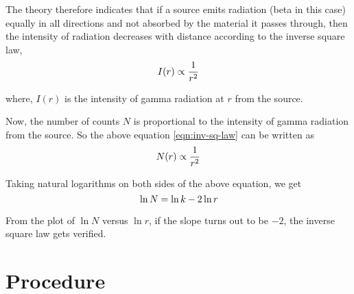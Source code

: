 	The theory therefore indicates that if a source emits radiation (beta in this case) equally in all directions and not absorbed by the material it passes through, then the intensity of radiation decreases with distance according to the inverse square law,
	\begin{equation}{\label{eqn:inv-sq-law}}
		I(r) \propto \dfrac{1}{r^2}
	\end{equation}
	
	where, $ I(r) $ is the intensity of gamma radiation at $ r $ from the source. 
	
	Now, the number of counts $ N $ is proportional to the intensity of gamma radiation from the source. So the above equation \ref{eqn:inv-sq-law} can be written as
	\begin{equation}{\label{eqn:inv-sq-law-N}}
		N(r) \propto \dfrac{1}{r^2}
	\end{equation}
	
	Taking natural logarithms on both sides of the above equation, we get
	\begin{equation}{\label{eqn:log-eqn}}
		\ln N = \ln k - 2\ln r
	\end{equation}
	
	From the plot of $ \ln N $ versus $ \ln r $, if the slope turns out to be $ -2 $, the inverse square law gets verified.
	
	\section{Procedure}
	
